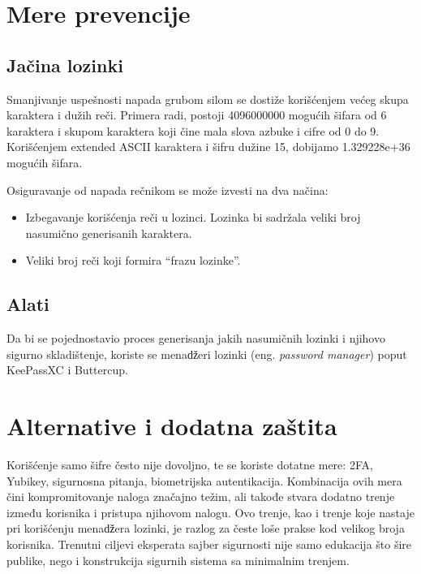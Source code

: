 \documentclass[fleqn, 12pt]{article}
\begin{document}
\section{Mere prevencije}
\subsection{Jačina lozinki}
\indent Smanjivanje uspešnosti napada grubom silom se dostiže korišćenjem većeg skupa karaktera i dužih reči. Primera radi, postoji 4096000000 mogućih šifara od 6 karaktera i skupom karaktera koji čine mala slova azbuke i cifre od 0 do 9. Korišćenjem extended ASCII karaktera i šifru dužine 15, dobijamo 1.329228e+36 mogućih šifara. 

Osiguravanje od napada rečnikom se može izvesti na dva načina:
\begin{itemize}
    \item Izbegavanje korišćenja reči u lozinci. Lozinka bi sadržala veliki broj nasumično generisanih karaktera.
    \item Veliki broj reči koji formira ``frazu lozinke''.
\end{itemize}

\subsection{Alati}
\indent Da bi se pojednostavio proces generisanja jakih nasumičnih lozinki i njihovo sigurno skladištenje, koriste se menaǆeri lozinki (eng. \emph{password manager}) poput KeePassXC i Buttercup. 

\section{Alternative i dodatna zaštita}
\indent Korišćenje samo šifre često nije dovoljno, te se koriste dotatne mere: 2FA, Yubikey, sigurnosna pitanja, biometrijska autentikacija. Kombinacija ovih mera čini kompromitovanje naloga značajno težim, ali takođe stvara dodatno trenje između korisnika i pristupa njihovom nalogu. Ovo trenje, kao i trenje koje nastaje pri korišćenju menaǆera lozinki, je razlog za česte loše prakse kod velikog broja korisnika. Trenutni ciljevi eksperata sajber sigurnosti nije samo edukacija što šire publike, nego i konstrukcija sigurnih sistema sa minimalnim trenjem. 


\end{document}
